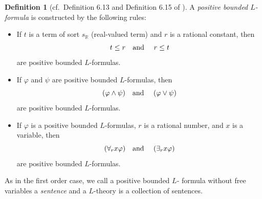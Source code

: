 \documentclass[11pt]{amsart}
\theoremstyle{definition}
\newtheorem{definition}[theorem]{Definition}
\theoremstyle{remark}
\begin{document}
\begin{definition}[cf.\ Definition 6.13 and Definition 6.15 of \cite{DI2017}]
A \emph{positive bounded $L$-formula} is constructed by the following rules:
\begin{itemize}
    \item If $t$ is a term of sort $s_{\mathbb{R}}$ (real-valued term) and $r$ is a rational constant, then 
    $$t\leq r\text{\quad and \quad} r\leq t$$
    are positive bounded $L$-formulas.
    \item If $\varphi$ and $\psi$ are positive bounded $L$-formulas, then 
    $$(\varphi\wedge \psi)\text{\quad and \quad} (\varphi \vee \psi)$$
    are positive bounded $L$-formulas. 
    \item If $\varphi$ is a positive bounded $L$-formulas, $r$ is a rational number, and $x$ is a variable, then 
    $$(\forall_r x\varphi)\text{\quad and \quad} (\exists_r x\varphi)$$
    are positive bounded $L$-formulas. 
\end{itemize}
As in the first order case, we call a positive bounded $L$- formula without free variables a \emph{sentence} and a $L$-theory is a collection of sentences.
\end{definition}
\end{document}
